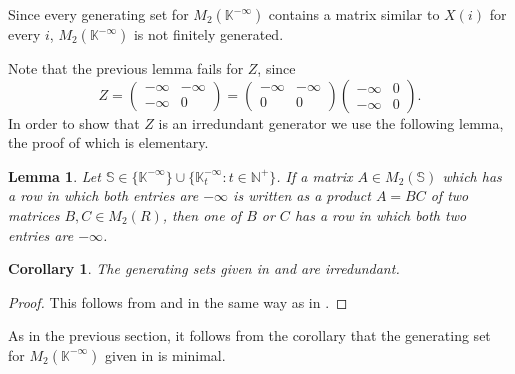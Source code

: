 \documentclass[11pt]{article}
\newtheorem{cor}[thm]{Corollary}
\newtheorem{lemma}[thm]{Lemma}
\numberwithin{equation}{section}
\newcommand{\set}[2]{\ensuremath{\{#1 : #2 \}}}
\renewcommand{\S}{\mathbb{S}}
\newcommand{\N}{\mathbb{N}}
\newcommand{\Np}{\N^{+}}
\newcommand{\K}{\mathbb{K}}
\newcommand{\Kmax}{\K^{-\infty}}
\newcommand{\Kmaxt}{\K^{-\infty}_t}
\newcommand{\mat}[4]{\begin{pmatrix}#1&#2\\#3&#4\end{pmatrix}}
\begin{document}
Since every generating set for $M_2(\Kmax)$ contains a matrix similar to $X(i)$
for every $i$, $M_2(\Kmax)$ is not finitely generated.

Note that the previous lemma fails for $Z$, since 
\[Z = \mat{-\infty}{-\infty}{-\infty}{0} = \mat{-\infty}{-\infty}{0}{0}
  \mat{-\infty}{0}{-\infty}{0}.\]
In order to show that $Z$ is an irredundant generator we use the following
lemma, the proof of which is elementary.

\begin{lemma}
  Let $\S \in \{\Kmax\} \cup \set{\Kmaxt}{t \in \Np}$. If a matrix $A \in M_2(\S)$
  which has a row in which both entries are $-\infty$ is written as a
  product $A = BC$ of two matrices $B, C \in M_2(R)$, then one of $B$ or $C$ has
  a row in which both two entries are $-\infty$.
\end{lemma}

\begin{cor}
  The generating sets given in  and
   are irredundant.
\end{cor}
\begin{proof}
  This follows from  and
   in the same way as in
  .
\end{proof}

As in the previous section, it follows from the corollary that
the generating set for $M_2(\Kmax)$ given in  is
minimal.
\end{document}

